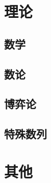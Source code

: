 \documentclass[12pt,a4paper,titlepage]{article}
\begin{document}
\section{\LARGE 理论}
	\subsection{数学}
    
    
    
    
    
    

	\subsection{数论}
	
	
    
    

	\subsection{博弈论}

    \subsection{特殊数列}

\section{\LARGE 其他}

\end{document}

